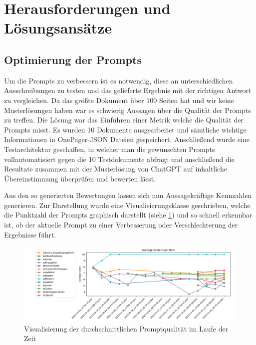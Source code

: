\section{Herausforderungen und Lösungsansätze}

\subsection{Optimierung der Prompts}
Um die Prompts zu verbessern ist es notwendig, diese an unterschiedlichen Ausschreibungen zu testen und das gelieferte
Ergebnis mit der richtigen Antwort zu vergleichen. Da das größte Dokument über 100 Seiten hat und wir keine
Musterlösungen haben war es schwierig Aussagen über die Qualität der Prompts zu treffen. Die Lösung war das Einführen
einer Metrik welche die Qualität der Prompts misst. Es wurden 10 Dokumente ausgearbeitet und sämtliche wichtige
Informationen in OnePager-JSON Dateien gespeichert. Anschließend wurde eine Testarchitektur geschaffen, in welcher man
die gewünschten Prompts vollautomatisiert gegen die 10 Testdokumente abfragt und anschließend die Resultate zusammen mit
der Musterlösung von ChatGPT auf inhaltliche Übereinstimmung überprüfen und bewerten lässt.

Aus den so generierten Bewertungen lassen sich nun Aussagekräftige Kennzahlen generieren. Zur Darstellung wurde eine
Visualisierungsklasse geschrieben, welche die Punktzahl der Prompts graphisch darstellt (siehe
\ref{fig:03_Prompt_Evaluierung}) und so schnell erkennbar ist, ob der aktuelle Prompt zu einer Verbesserung oder
Verschlechterung der Ergebnisse führt.

\begin{figure}[hbt]
    \centering
    \includegraphics[width=1\textwidth]{figures/03_Prompt_Evaluierung.png}
    \caption{Visualisierung der durchschnittlichen Promptqualität im Laufe der Zeit}
    \label{fig:03_Prompt_Evaluierung}    %
\end{figure}

